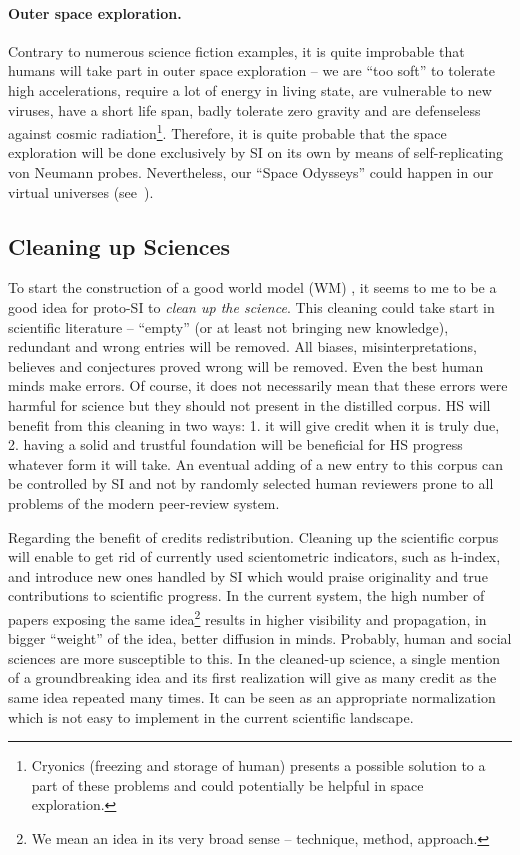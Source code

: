 \documentclass[a4paper,11pt]{article}
\begin{document}
\paragraph{Outer space exploration.}
Contrary to numerous science fiction examples, it is quite improbable that humans will take part in outer space exploration -- we are ``too soft'' to tolerate high accelerations, require a lot of energy in living state, are vulnerable to new viruses, have a short life span, badly tolerate zero gravity and are defenseless against cosmic radiation\footnote{Cryonics (freezing and storage of human) presents a possible solution to a part of these problems and could potentially be helpful in space exploration.}. Therefore, it is quite probable that the space exploration will be done exclusively by SI on its own by means of self-replicating von Neumann probes. Nevertheless, our ``Space Odysseys'' could happen in our virtual universes (see~).

\subsection{Cleaning up Sciences}

To start the construction of a good world model (WM) , it seems to me to be a good idea for proto-SI  to \emph{clean up the science}. This cleaning could take start in scientific literature -- ``empty'' (or at least not bringing new knowledge), redundant and wrong entries will be removed. All biases, misinterpretations, believes and conjectures proved wrong will be removed.  Even the best human minds make errors. Of course, it does not necessarily mean that these errors were harmful for science but they should not present in the distilled corpus. HS will benefit from this cleaning in two ways: 1. it will give credit when it is truly due, 2. having a solid and trustful foundation will be beneficial for HS progress whatever form it will take. An eventual adding of a new entry to this corpus can be controlled by SI and not by randomly selected human reviewers prone to all problems of the modern peer-review system.

Regarding the benefit of credits redistribution. Cleaning up the scientific corpus will enable to get rid of currently used scientometric indicators, such as h-index, and introduce new ones handled by SI which would praise originality and true contributions to scientific progress. In the current system, the high number of papers exposing the same idea\footnote{We mean an idea in its very broad sense -- technique, method, approach.} results in higher visibility and propagation, in bigger ``weight'' of the idea, better diffusion in minds. Probably, human and social sciences are more susceptible to this. In the cleaned-up science, a single mention of a groundbreaking idea and its first realization will give as many credit as the same idea repeated many times. It can be seen as an appropriate normalization which is not easy to implement in the current scientific landscape.
\end{document}
